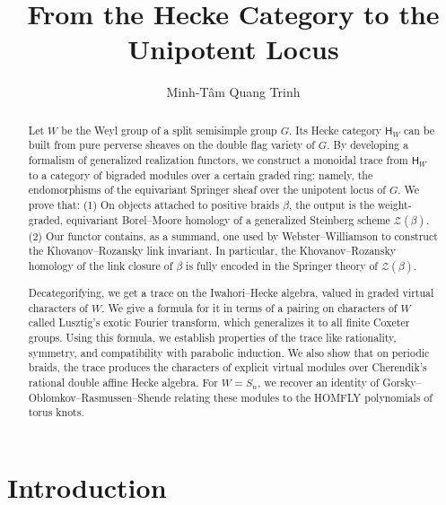 \documentclass[a4paper,10pt,leqno]{amsart}
\theoremstyle{plain}
\theoremstyle{plain}
\theoremstyle{plain}
\theoremstyle{definition}
\theoremstyle{remark}
\begin{document}
\title{From the Hecke Category to the Unipotent Locus}
\author{Minh-T\^{a}m Quang Trinh}
\address{Massachusetts Institute of Technology, 77 Massachusetts Avenue, Cambridge, MA 02139}

\maketitle

\begin{abstract}
Let $W$ be the Weyl group of a split semisimple group $G$.
Its Hecke category $\mathsf{H}_W$ can be built from pure perverse sheaves on the double flag variety of $G$.
By developing a formalism of generalized realization functors, we construct a monoidal trace from $\mathsf{H}_W$ to a category of bigraded modules over a certain graded ring: namely, the endomorphisms of the equivariant Springer sheaf over the unipotent locus of $G$.
We prove that: (1) On objects attached to positive braids $\beta$, the output is the weight-graded, equivariant Borel--Moore homology of a generalized Steinberg scheme $\mathcal{Z}(\beta)$.
(2) Our functor contains, as a summand, one used by Webster--Williamson to construct the Khovanov--Rozansky link invariant.
In particular, the Khovanov--Rozansky homology of the link closure of $\beta$ is fully encoded in the Springer theory of $\mathcal{Z}(\beta)$.

Decategorifying, we get a trace on the Iwahori--Hecke algebra, valued in graded virtual characters of $W$.
We give a formula for it in terms of a pairing on characters of $W$ called Lusztig's exotic Fourier transform, which generalizes it to all finite Coxeter groups.
Using this formula, we establish properties of the trace like rationality, symmetry, and compatibility with parabolic induction.
We also show that on periodic braids, the trace produces the characters of explicit virtual modules over Cherendik's rational double affine Hecke algebra.
For $W = S_n$, we recover an identity of Gorsky--Oblomkov--Rasmussen--Shende relating these modules to the HOMFLY polynomials of torus knots.
\end{abstract}

\setcounter{tocdepth}{1}
\tableofcontents
\thispagestyle{empty}


\newpage

\section*{Introduction}
\end{document}
